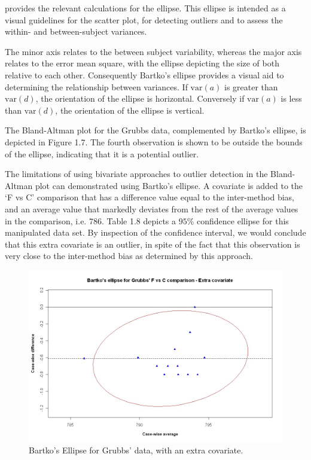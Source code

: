 \documentclass[12pt, a4paper]{report}
\theoremstyle{plain}
\theoremstyle{definition}
\theoremstyle{remark}
\begin{document}
\citet{AltmanEllipse} provides the relevant calculations for the ellipse. This ellipse is intended as a visual
guidelines for the scatter plot, for detecting outliers and to
assess the within- and between-subject variances.

The minor axis relates to the between subject variability, whereas
the major axis relates to the error mean square, with the ellipse
depicting the size of both relative to each other.
Consequently Bartko's ellipse provides a visual aid to determining the
relationship between variances. If $\mbox{var}(a)$ is greater than $\mbox{var}(d)$, the orientation of the ellipse is horizontal. Conversely if $\mbox{var}(a)$ is less than $\mbox{var}(d)$, the orientation of the ellipse is vertical.





The Bland-Altman plot for the Grubbs data, complemented by Bartko's ellipse, is depicted in Figure 1.7.
The fourth observation is shown to be outside the bounds of the ellipse, indicating that it is a potential outlier.




The limitations of using bivariate approaches to outlier detection
in the Bland-Altman plot can demonstrated using Bartko's ellipse.
A covariate is added to the `F vs C' comparison that has a
difference value equal to the inter-method bias, and an average
value that markedly deviates from the rest of the average values
in the comparison, i.e. 786. Table 1.8 depicts a $95\%$ confidence
ellipse for this manipulated data set. By inspection of the
confidence interval, we would conclude that this extra
covariate is an outlier, in spite of the fact that this
observation is very close to the inter-method bias as determined by this approach.

\begin{figure}[h!]
	\includegraphics[width=130mm]{images/GrubbsBartko2.jpeg}
	\caption{Bartko's Ellipse for Grubbs' data, with an extra covariate.}\label{GrubbsBartko2}
\end{figure}
\end{document}
